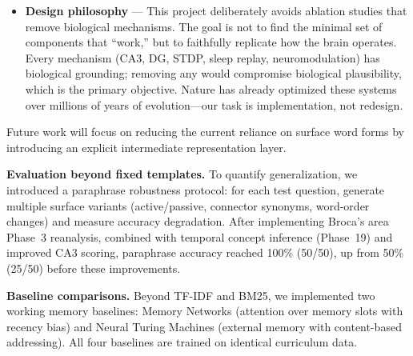 \documentclass[11pt]{article}
\begin{document}
\begin{itemize}
      \textbf{Baselines:}
      \begin{itemize}
        \item TF-IDF --- term frequency-inverse document frequency
        \item BM25 --- probabilistic IR model (Robertson et al.)
        \item Memory Networks (Weston et al. 2015) --- attention over memory slots
        \item Neural Turing Machines (Graves et al. 2014) --- external memory addressing
      \end{itemize}
      QA Baselines (TF-IDF, BM25): tested on all QA tests.
      Working Memory Baselines (MemNet, NTM): tested on all 20 bAbI tasks.
      The goal is NOT to beat all baselines, but to demonstrate unique capabilities:
      working memory (bAbI), source memory (trust-weighted retrieval), and biological plausibility.
\item \textbf{Design philosophy} --- This project deliberately avoids ablation studies that remove 
      biological mechanisms. The goal is not to find the minimal set of components that ``work,'' 
      but to faithfully replicate how the brain operates. Every mechanism (CA3, DG, STDP, sleep replay, 
      neuromodulation) has biological grounding; removing any would compromise biological plausibility, 
      which is the primary objective. Nature has already optimized these systems over millions of years 
      of evolution---our task is implementation, not redesign.
\end{itemize}

Future work will focus on reducing the current reliance on surface word forms by
introducing an explicit intermediate representation layer.

\textbf{Evaluation beyond fixed templates.} To quantify generalization, we introduced a
paraphrase robustness protocol: for each test question, generate multiple surface variants
(active/passive, connector synonyms, word-order changes) and measure accuracy degradation.
After implementing Broca's area Phase~3 reanalysis, combined with temporal concept inference
(Phase~19) and improved CA3 scoring, paraphrase accuracy reached 100\% (50/50), up from
50\% (25/50) before these improvements.

\textbf{Baseline comparisons.} Beyond TF-IDF and BM25, we implemented two 
working memory baselines: Memory Networks (attention over memory slots with recency bias) 
and Neural Turing Machines (external memory with content-based addressing).
All four baselines are trained on identical curriculum data.
\end{document}
